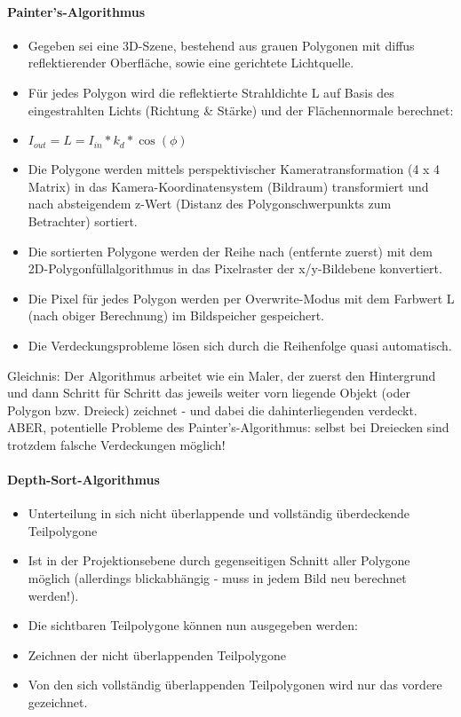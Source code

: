 \documentclass[10pt,landscape]{article}
\begin{document}
\begin{multicols}{3}
\paragraph{Painter’s-Algorithmus}
\begin{itemize}
  \item Gegeben sei eine 3D-Szene, bestehend aus grauen Polygonen mit diffus reflektierender Oberfläche, sowie eine gerichtete Lichtquelle.
  \item Für jedes Polygon wird die reflektierte Strahldichte L auf Basis des eingestrahlten Lichts (Richtung \& Stärke) und der Flächennormale berechnet:
  \item $I_{out} = L = I_{in}* k_d * \cos(\phi)$
  \item Die Polygone werden mittels perspektivischer Kameratransformation (4 x 4 Matrix) in das Kamera-Koordinatensystem (Bildraum) transformiert und nach absteigendem z-Wert (Distanz des Polygonschwerpunkts zum Betrachter) sortiert.
  \item Die sortierten Polygone werden der Reihe nach (entfernte zuerst) mit dem 2D-Polygonfüllalgorithmus in das Pixelraster der x/y-Bildebene konvertiert.
  \item Die Pixel für jedes Polygon werden per Overwrite-Modus mit dem Farbwert L (nach obiger Berechnung) im Bildspeicher gespeichert.
  \item Die Verdeckungsprobleme lösen sich durch die Reihenfolge quasi automatisch.
\end{itemize}

Gleichnis: Der Algorithmus arbeitet wie ein Maler, der zuerst den Hintergrund und dann Schritt für Schritt das jeweils weiter vorn liegende Objekt (oder Polygon bzw. Dreieck) zeichnet - und dabei die dahinterliegenden verdeckt. ABER, potentielle Probleme des Painter’s-Algorithmus: selbst bei Dreiecken sind trotzdem falsche Verdeckungen möglich!

\paragraph{Depth-Sort-Algorithmus}
\begin{itemize}
  \item Unterteilung in sich nicht überlappende und vollständig überdeckende Teilpolygone
  \item Ist in der Projektionsebene durch gegenseitigen Schnitt aller Polygone möglich (allerdings blickabhängig - muss in jedem Bild neu berechnet werden!).
  \item Die sichtbaren Teilpolygone können nun ausgegeben werden:
  \item Zeichnen der nicht überlappenden Teilpolygone
  \item Von den sich vollständig überlappenden Teilpolygonen wird nur das vordere gezeichnet.
\end{itemize}


\end{multicols}
\end{document}
